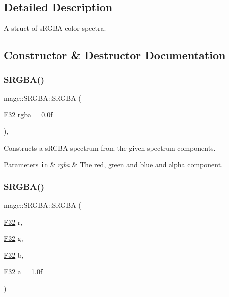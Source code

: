 \subsection{Detailed Description}
A struct of s\+R\+G\+BA color spectra. 

\subsection{Constructor \& Destructor Documentation}
\hypertarget{structmage_1_1_s_r_g_b_a_ac7f39423da637e68377b5986a60855f2}{}\label{structmage_1_1_s_r_g_b_a_ac7f39423da637e68377b5986a60855f2} 
\subsubsection{\texorpdfstring{S\+R\+G\+B\+A()}{SRGBA()}\hspace{0.1cm}{\footnotesize\ttfamily [1/8]}}
{\footnotesize\ttfamily mage\+::\+S\+R\+G\+B\+A\+::\+S\+R\+G\+BA (\begin{DoxyParamCaption}\item[{\hyperlink{namespacemage_aa97e833b45f06d60a0a9c4fc22ae02c0}{F32}}]{rgba = {\ttfamily 0.0f} }\end{DoxyParamCaption})\hspace{0.3cm}{\ttfamily [explicit]}, {\ttfamily [noexcept]}}

Constructs a s\+R\+G\+BA spectrum from the given spectrum components.


\begin{DoxyParams}[1]{Parameters}
\mbox{\tt in}  & {\em rgba} & The red, green and blue and alpha component. \\
\hline
\end{DoxyParams}
\hypertarget{structmage_1_1_s_r_g_b_a_a3497aed51744d2c91523916c0532bd86}{}\label{structmage_1_1_s_r_g_b_a_a3497aed51744d2c91523916c0532bd86} 
\subsubsection{\texorpdfstring{S\+R\+G\+B\+A()}{SRGBA()}\hspace{0.1cm}{\footnotesize\ttfamily [2/8]}}
{\footnotesize\ttfamily mage\+::\+S\+R\+G\+B\+A\+::\+S\+R\+G\+BA (\begin{DoxyParamCaption}\item[{\hyperlink{namespacemage_aa97e833b45f06d60a0a9c4fc22ae02c0}{F32}}]{r,  }\item[{\hyperlink{namespacemage_aa97e833b45f06d60a0a9c4fc22ae02c0}{F32}}]{g,  }\item[{\hyperlink{namespacemage_aa97e833b45f06d60a0a9c4fc22ae02c0}{F32}}]{b,  }\item[{\hyperlink{namespacemage_aa97e833b45f06d60a0a9c4fc22ae02c0}{F32}}]{a = {\ttfamily 1.0f} }\end{DoxyParamCaption})\hspace{0.3cm}{\ttfamily [noexcept]}}

